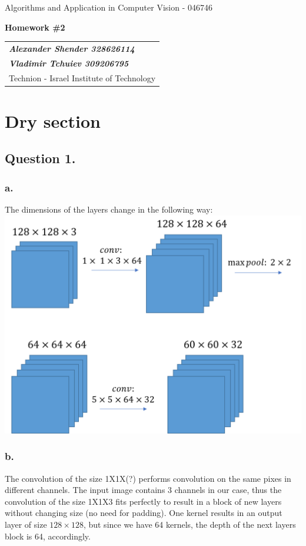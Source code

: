 \documentclass[a4paper]{iacas}
\begin{document}
\begin{center}
 \large Algorithms and Application in Computer Vision - 046746
 \end{center}
\begin{center}
\large\textbf{Homework \#2}
 \end{center}


\begin{tabular}{l}
\\
{\bf\textit{Alexander Shender 328626114}} \\
{\bf\textit{Vladimir Tchuiev 309206795}} \\
Technion - Israel Institute of Technology
\end{tabular}


\newpage
\tableofcontents
\newpage

\section{Dry section}

\subsection{Question 1.}
\subsubsection{a.}

The dimensions of the layers change in the following way:
\newline
\includegraphics[scale=0.7]{imgs/q_1_1.png}
\newline
\subsubsection{b.}
The convolution of the size 1X1X(?) performs convolution on the same pixes in different channels. The input image contains 3 channels in our case, thus the convolution of the size 1X1X3 fits perfectly to result in a block of new layers without changing size (no need for padding). One kernel results in an output layer of size $128\times128$, but since we have 64 kernels, the depth of the next layers block is 64, accordingly.
\end{document}

